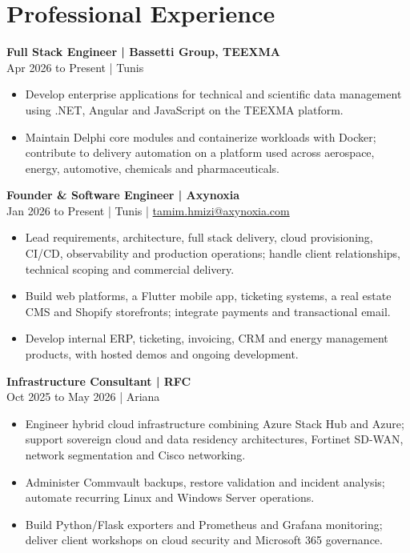 \documentclass[11pt,a4paper]{article}
\newcommand{\role}[3]{\Needspace{5\baselineskip}\textbf{#1 | #2}\\#3\par}
\begin{document}
\section{Professional Experience}
\role{Full Stack Engineer}{Bassetti Group, TEEXMA}{Apr 2026 to Present | Tunis}
\begin{itemize}
\item Develop enterprise applications for technical and scientific data management using .NET, Angular and JavaScript on the TEEXMA platform.
\item Maintain Delphi core modules and containerize workloads with Docker; contribute to delivery automation on a platform used across aerospace, energy, automotive, chemicals and pharmaceuticals.
\end{itemize}

\role{Founder \& Software Engineer}{Axynoxia}{Jan 2026 to Present | Tunis | \href{mailto:tamim.hmizi@axynoxia.com}{tamim.hmizi@axynoxia.com}}
\begin{itemize}
\item Lead requirements, architecture, full stack delivery, cloud provisioning, CI/CD, observability and production operations; handle client relationships, technical scoping and commercial delivery.
\item Build web platforms, a Flutter mobile app, ticketing systems, a real estate CMS and Shopify storefronts; integrate payments and transactional email.
\item Develop internal ERP, ticketing, invoicing, CRM and energy management products, with hosted demos and ongoing development.
\end{itemize}

\role{Infrastructure Consultant}{RFC}{Oct 2025 to May 2026 | Ariana}
\begin{itemize}
\item Engineer hybrid cloud infrastructure combining Azure Stack Hub and Azure; support sovereign cloud and data residency architectures, Fortinet SD-WAN, network segmentation and Cisco networking.
\item Administer Commvault backups, restore validation and incident analysis; automate recurring Linux and Windows Server operations.
\item Build Python/Flask exporters and Prometheus and Grafana monitoring; deliver client workshops on cloud security and Microsoft 365 governance.
\end{itemize}
\end{document}
